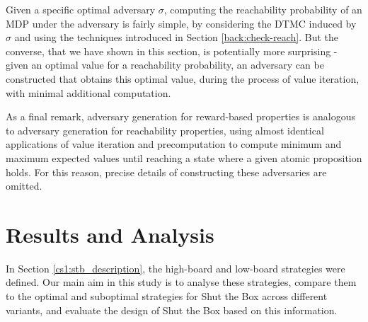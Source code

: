 
Given a specific optimal adversary $\sigma$, computing the reachability probability of an MDP under the adversary is fairly simple, by considering the DTMC induced by $\sigma$ and using the techniques introduced in Section \ref{back:check-reach}. But the converse, that we have shown in this section, is potentially more surprising - given an optimal value for a reachability probability, an adversary can be constructed that obtains this optimal value, during the process of value iteration, with minimal additional computation.

As a final remark, adversary generation for reward-based properties is analogous to adversary generation for reachability properties, using almost identical applications of value iteration and precomputation to compute minimum and maximum expected values until reaching a state where a given atomic proposition holds. For this reason, precise details of constructing these adversaries are omitted.

\section{Results and Analysis}
\label{cs1:stb_results}

In Section \ref{cs1:stb_description}, the high-board and low-board strategies were defined. Our main aim in this study is to analyse these strategies, compare them to the optimal and suboptimal strategies for Shut the Box across different variants, and evaluate the design of Shut the Box based on this information.




